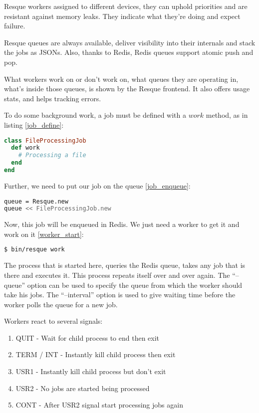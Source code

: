 Resque workers assigned to different devices, they can uphold priorities and are resistant against memory leaks. They indicate what they're doing and expect failure.

Resque queues are always available, deliver visibility into their internals and stack the jobs as JSONs. Also, thanks to Redis, Redis queues support atomic push and pop.

What workers work on or don't work on, what queues they are operating in, what's inside those queues, is shown by the Resque frontend. It also offers usage stats, and helps tracking errors.

To do some background work, a job must be defined with a $work$ method, as in listing \ref{job_define}:

\begin{lstlisting}[language=Ruby, caption={Defining a job class}, label=job_define]
class FileProcessingJob
  def work
    # Processing a file
  end
end
\end{lstlisting}

Further, we need to put our job on the queue \ref{job_enqueue}:

\begin{lstlisting}[language=Bash, caption={Enqueue a job}, label=job_enqueue]
queue = Resque.new
queue << FileProcessingJob.new
\end{lstlisting}

Now, this job will be enqueued in Redis. We just need a worker to get it and work on it \ref{worker_start}:
\begin{lstlisting}[language=Bash, caption={Create a worker}, label=worker_start]
$ bin/resque work
\end{lstlisting}

The process that is started here, queries the Redis queue, takes any job that is there and executes it. This process repeats itself over and over again. The ``--queue'' option can be used to specify the queue from which the worker should take his jobs. The ``--interval'' option is used to give waiting time before the worker polls the queue for a new job.

Workers react to several signals:
\begin{enumerate}
  \item QUIT - Wait for child process to end then exit
  \item TERM / INT - Instantly kill child process then exit
  \item USR1 - Instantly kill child process but don't exit
  \item USR2 - No jobs are started being processed
  \item CONT - After USR2 signal start processing jobs again
\end{enumerate}

